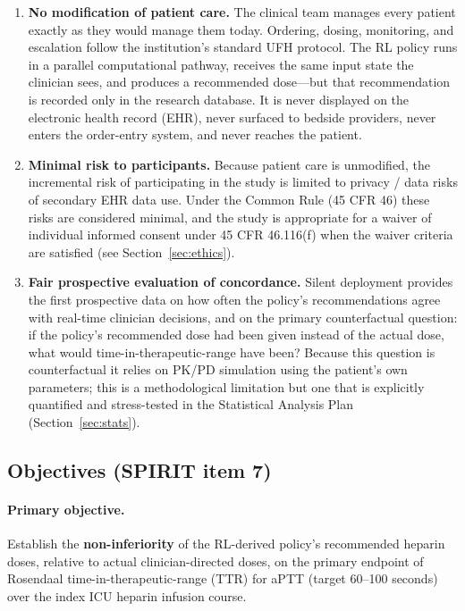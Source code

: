 \documentclass[11pt]{article}
\begin{document}
\begin{enumerate}
  \item \textbf{No modification of patient care.} The clinical team manages every patient exactly as they would manage them today. Ordering, dosing, monitoring, and escalation follow the institution's standard UFH protocol. The RL policy runs in a parallel computational pathway, receives the same input state the clinician sees, and produces a recommended dose---but that recommendation is recorded only in the research database. It is never displayed on the electronic health record (EHR), never surfaced to bedside providers, never enters the order-entry system, and never reaches the patient.
  \item \textbf{Minimal risk to participants.} Because patient care is unmodified, the incremental risk of participating in the study is limited to privacy / data risks of secondary EHR data use. Under the Common Rule (45 CFR 46) these risks are considered minimal, and the study is appropriate for a waiver of individual informed consent under 45 CFR 46.116(f) when the waiver criteria are satisfied (see Section~\ref{sec:ethics}).
  \item \textbf{Fair prospective evaluation of concordance.} Silent deployment provides the first prospective data on how often the policy's recommendations agree with real-time clinician decisions, and on the primary counterfactual question: if the policy's recommended dose had been given instead of the actual dose, what would time-in-therapeutic-range have been? Because this question is counterfactual it relies on PK/PD simulation using the patient's own parameters; this is a methodological limitation but one that is explicitly quantified and stress-tested in the Statistical Analysis Plan (Section~\ref{sec:stats}).
\end{enumerate}

\subsection{Objectives (SPIRIT item 7)}

\paragraph{Primary objective.} Establish the \textbf{non-inferiority} of the RL-derived policy's recommended heparin doses, relative to actual clinician-directed doses, on the primary endpoint of Rosendaal time-in-therapeutic-range (TTR) for aPTT (target 60--100 seconds) over the index ICU heparin infusion course.
\end{document}
